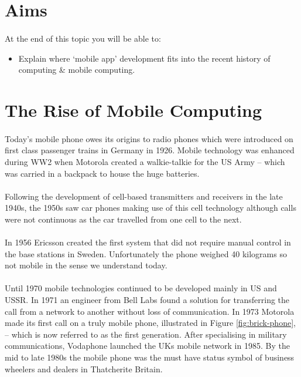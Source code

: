 \documentclass[12pt, a4paper, twoside]{book}
\begin{document}
\section{Aims}
\paragraph{} At the end of this topic you will be able to:

\begin{itemize}
\item Explain where ‘mobile app’ development fits into the recent history of computing \& mobile computing. 
\end{itemize}


\section{The Rise of Mobile Computing}
\paragraph{} Today's mobile phone owes its origins to radio phones which were introduced on first class passenger trains in Germany in 1926. Mobile technology was enhanced during WW2 when Motorola created a walkie-talkie for the US Army – which was carried in a backpack to house the huge batteries.

\paragraph{} Following the development of cell-based transmitters and receivers in the late 1940s, the 1950s saw car phones making use of this cell technology although calls were not continuous as the car travelled from one cell to the next.

\paragraph{} In 1956 Ericsson created the first system that did not require manual control in the base stations in Sweden. Unfortunately the phone weighed 40 kilograms so not mobile in the sense we understand today.

\paragraph{} Until 1970 mobile technologies continued to be developed mainly in US and USSR. In 1971 an engineer from Bell Labs found a solution for transferring the call from a network to another without loss of communication. In 1973 Motorola made its first call on a truly mobile phone, illustrated in Figure \ref{fig:brick-phone}, – which is now referred to as the first generation. After specialising in military communications, Vodaphone launched the UKs mobile network in 1985. By the mid to late 1980s the mobile phone was the must have status symbol of business wheelers and dealers in Thatcherite Britain.
\end{document}
